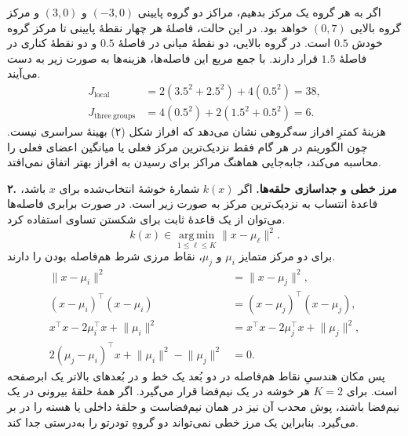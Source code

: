 \documentclass{article}
\numberwithin{equation}{section}
\numberwithin{table}{section}
\begin{document}
اگر به هر گروه یک مرکز بدهیم، مراکز دو گروه پایینی \((-3,0)\) و \((3,0)\) و مرکز گروه بالایی \((0,7)\) خواهد بود. در این حالت، فاصلهٔ هر چهار نقطهٔ پایینی تا مرکز گروه خودش \(0.5\) است. در گروه بالایی، دو نقطهٔ میانی در فاصلهٔ \(0.5\) و دو نقطهٔ کناری در فاصلهٔ \(1.5\) قرار دارند. با جمع مربع این فاصله‌ها، هزینه‌ها به صورت زیر به دست می‌آیند.
\begin{align*}
    J_{\mathrm{local}}&=2(3.5^2+2.5^2)+4(0.5^2)=38,\\
    J_{\mathrm{three\ groups}}&=4(0.5^2)+2(1.5^2+0.5^2)=6.
\end{align*}
هزینهٔ کمترِ افراز سه‌گروهی نشان می‌دهد که افراز شکل (۲) بهینهٔ سراسری نیست. چون الگوریتم در هر گام فقط نزدیک‌ترین مرکز فعلی یا میانگین اعضای فعلی را محاسبه می‌کند، جابه‌جایی هماهنگ مراکز برای رسیدن به افراز بهتر اتفاق نمی‌افتد.

\noindent\textbf{۲. مرز خطی و جداسازی حلقه‌ها.}
اگر \(k(x)\) شمارهٔ خوشهٔ انتخاب‌شده برای \(x\) باشد، قاعدهٔ انتساب به نزدیک‌ترین مرکز به صورت زیر است. در صورت برابری فاصله‌ها می‌توان از یک قاعدهٔ ثابت برای شکستن تساوی استفاده کرد.
\[
    k(x)\in\operatorname*{arg\,min}_{1\leq \ell\leq K}
    \lVert x-\mu_\ell\rVert^2.
\]
برای دو مرکز متمایز \(\mu_i\) و \(\mu_j\)، نقاط مرزی شرط هم‌فاصله بودن را دارند.
\begin{align*}
    \lVert x-\mu_i\rVert^2&=\lVert x-\mu_j\rVert^2,\\
    (x-\mu_i)^\top(x-\mu_i)&=(x-\mu_j)^\top(x-\mu_j),\\
    x^\top x-2\mu_i^\top x+\lVert\mu_i\rVert^2
    &=x^\top x-2\mu_j^\top x+\lVert\mu_j\rVert^2,\\
    2(\mu_j-\mu_i)^\top x
      +\lVert\mu_i\rVert^2-\lVert\mu_j\rVert^2&=0.
\end{align*}
پس مکان هندسیِ نقاط هم‌فاصله در دو بُعد یک خط و در بُعدهای بالاتر یک ابرصفحه است. برای \(K=2\) هر خوشه در یک نیم‌فضا قرار می‌گیرد. اگر همهٔ حلقهٔ بیرونی در یک نیم‌فضا باشند، پوش محدب آن نیز در همان نیم‌فضاست و حلقهٔ داخلی یا هسته را در بر می‌گیرد. بنابراین یک مرز خطی نمی‌تواند دو گروهِ تودرتو را به‌درستی جدا کند.
\end{document}
